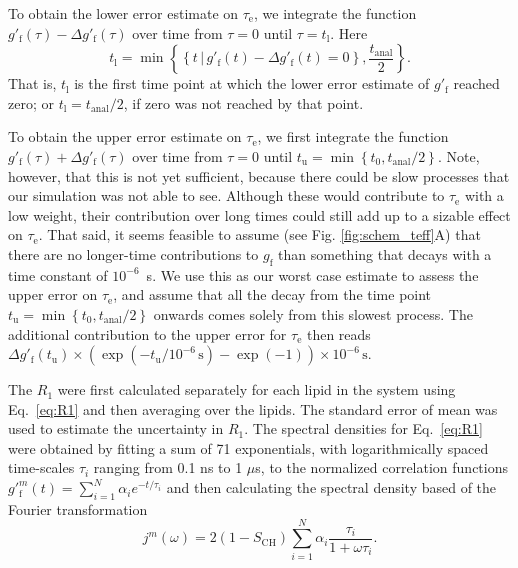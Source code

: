 \documentclass[journal=jpcbfk,manuscript=article,layout=twocolumn]{achemso}
\begin{document}
To obtain the lower error estimate on $\tau_\mathrm e$, we integrate the function
$g'_{\mathrm{f}}(\tau) - \Delta g'_{\mathrm{f}}(\tau)$ over time from $\tau=0$ until $\tau=t_\mathrm l$.
Here
\begin{equation}
t_\mathrm l= \min
\left\{
	\left\{
		t\,|\,g'_{\mathrm{f}}(t) - \Delta g'_{\mathrm{f}}(t) = 0
	\right\},
	\frac{t_\mathrm{anal}}{2}
\right\}.
\end{equation}
That is,
$t_\mathrm l$ is
the first time point at which the lower error estimate of $g'_\mathrm f$ reached zero;
or $t_\mathrm l=t_\mathrm{anal}/2$, if zero was not reached by that point.

To obtain the upper error estimate on $\tau_\mathrm e$, we first integrate the function
$g'_{\mathrm{f}}(\tau) + \Delta g'_{\mathrm{f}}(\tau)$ over time from $\tau=0$ until
$
t_\mathrm u= \min
\left\{
	t_0,
	{t_\mathrm{anal}}/{2}
\right\}.
$
Note, however,
that this is not yet sufficient, because there could be slow processes that our simulation was not
able to see. Although these would contribute to $\tau_\mathrm e$ with a low weight,
their contribution over long times could still add up to a sizable effect on $\tau_\mathrm e$.
%
That said, it seems feasible to assume (see Fig. \ref{fig:schem_teff}A) that there are no longer-time contributions
to $g_\mathrm f$ than something that decays with a time constant of $10^{-6}$~s.
%
We use this as our worst case estimate to assess the upper error on $\tau_\mathrm e$, and
%
assume that all the decay from the time point
$
t_\mathrm u= \min
\left\{
	t_0,
	{t_\mathrm{anal}}/{2}
\right\}
$
onwards comes solely from this slowest process.
%
The additional contribution to the upper error for $\tau_\mathrm e$ then reads
$
\Delta g'_\mathrm f(t_\mathrm u) \times \left(\exp(-t_\mathrm u / 10^{-6}\,\mathrm s) - \exp(-1)\right) \times 10^{-6}\,\mathrm s.
$

The $R_{1}$ were first calculated separately for each lipid in the system using Eq.~\eqref{eq:R1} and then averaging over the lipids. The standard error of mean was used to estimate the uncertainty in $R_{1}$. The spectral densities for Eq.~\eqref{eq:R1} were obtained by fitting a sum of 71 exponentials, with logarithmically spaced time-scales $\tau_{i}$ ranging from 0.1 ns to 1 $\mu$s, to the normalized correlation functions $g'^m_{\mathrm{f}}(t)=\sum_{i=1}^{N}\alpha_{i}e^{-t/\tau_{i}}$ and then calculating the spectral density based of the Fourier transformation\cite{ferreira15}
\begin{equation}
j^m{(\omega)}=2(1-S_\mathrm{CH})\sum_{i=1}^{N}\alpha_{i}\frac{\tau_{i}}{1+\omega\tau_{i}} .
\end{equation}
\end{document}
